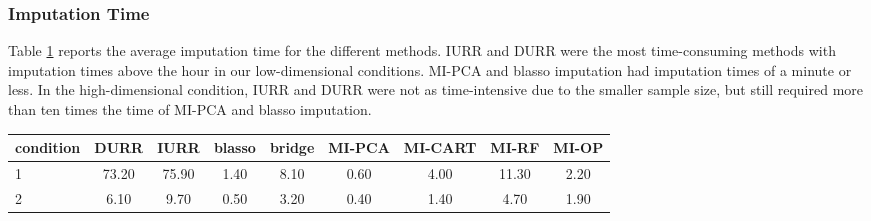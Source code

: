 \FloatBarrier

\subsubsection{Imputation Time}

	Table \ref{tab:time} reports the average imputation time for the different methods.
	IURR and DURR were the most time-consuming methods with imputation times above the hour 
	in our low-dimensional conditions. 
	MI-PCA and blasso imputation had imputation times of a minute or less.
	In the high-dimensional condition, IURR and DURR were not as time-intensive due to the smaller
	sample size, but still required more than ten times the time of MI-PCA and blasso imputation.

\begin{table}
	{
	\begin{tabular}{l c c c c c c c c} 
		\toprule
		condition & DURR & IURR & blasso & bridge & MI-PCA & MI-CART & MI-RF & MI-OP \\
		\midrule
		1 & 73.20 & 75.90 & 1.40 & 8.10 & 0.60 & 4.00 & 11.30 & 2.20 \\ 
		2 & 6.10 & 9.70 & 0.50 & 3.20 & 0.40 & 1.40 & 4.70 & 1.90 \\	
		\bottomrule
	\end{tabular}
	}
\label{tab:time}
\end{table}

\FloatBarrier


